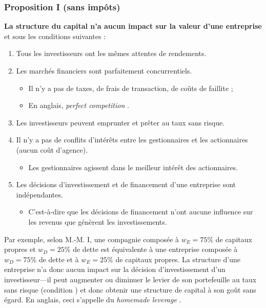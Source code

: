 \documentclass[10pt, french]{article}
\begin{document}
\begin{multicols*}{2}
\subsubsection{Proposition I (sans impôts)}
\textbf{La structure du capital n'a aucun impact sur la valeur d'une entreprise} et  sous les conditions suivantes :
\begin{definitionNOHFILLpropos}
\begin{enumerate}[label	=	\circled{\arabic*}{trueblue}]
	\item	Tous les investisseurs ont les mêmes attentes de rendements.
	\item	Les marchés financiers sont parfaitement concurrentiels.
		\begin{itemize}
		\item	Il n'y a pas de taxes, de frais de transaction, de coûts de faillite ;
		\item	En anglais, \og \textit{perfect competition} \fg{}.
		\end{itemize}
	\item	Les investisseurs peuvent emprunter et prêter au taux sans risque.
	\item	Il n'y a pas de conflits d'intérêts entre les gestionnaires et les actionnaires (aucun coût d'agence).
		\begin{itemize}
		\item	Les gestionnaires agissent dans le meilleur intérêt des actionnaires.
		\end{itemize}
	\item	Les décisions d'investissement et de financement d'une entreprise sont indépendantes.
		\begin{itemize}
		\item	C'est-à-dire que les décisions de financement n’ont aucune influence sur les revenus que génèrent les investissements.
		\end{itemize}
\end{enumerate}
\end{definitionNOHFILLpropos}

Par exemple, selon M.-M. I, une compagnie composée à $w_{E} = 75\%$ de capitaux propres et $w_{D} = 25\%$ de dette est équivalente à une entreprise composée à $w_{D} = 75\%$ de dette et à $w_{E} = 25\%$ de capitaux propres. La structure d'une entreprise n'a donc aucun impact sur la décision d'investissement d'un investisseur---il peut augmenter ou diminuer le levier de son portefeuille au taux sans risque (condition ) et donc obtenir une structure de capital à son goût sans égard. En anglais, ceci s'appelle du \og \textit{homemade leverage} \fg{}. \\


\end{multicols*}
\end{document}
